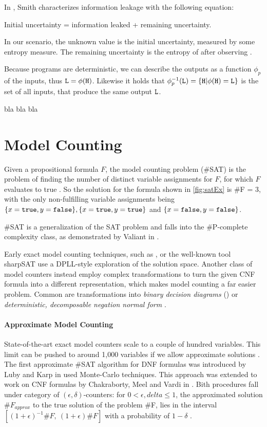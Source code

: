 In \cite{smith09}, Smith characterizes information leakage with the following equation:
\begin{center}
    Initial uncertainty = information leaked + remaining uncertainty.
\end{center}
In our scenario, the unknown value \In is the initial uncertainty, measured by some entropy measure. The remaining uncertainty is the entropy of \In after observing \Out. 

Because programs are deterministic, we can describe the outputs as a function $\phi_p$ of the inputs, thus $\mathtt{L} = \phi(\mathtt{H})$. Likewise it holds that $\phi_p^{-1}(\mathtt{L}) = \{ \mathtt{H} | \phi(\mathtt{H}) = \mathtt{L} \}$ is the set of all inputs, that produce the same output $\mathtt{L}$.

\begin{definition}
        bla bla bla
\end{definition}

\section{Model Counting}

Given a propositional formula $F$, the model counting problem (\#SAT) is the problem of finding the number of distinct variable assignments for $F$, for which $F$ evaluates to true \cite{biere09}. So the solution for the formula shown in  \ref{fig:satEx} is \#F = 3, with the only non-fulfilling variable assignments being $\{ x = \mathtt{true}, y = \mathtt{false}\}, \{x = \mathtt{true}, y = \mathtt{true}\}$ and  $\{x = \mathtt{false}, y = \mathtt{false}\}$.

\#SAT is a generalization of the SAT problem and falls into the \#P-complete complexity class, as demonstrated by Valiant in \cite{valiant79}.

Early exact model counting techniques, such as \cite{birnbaum99}, or the well-known tool sharpSAT \cite{thurley06} use a DPLL-style exploration of the solution space. Another class of model counters instead employ complex transformations to turn the given CNF formula into a different representation, which makes model counting a far easier problem. Common are transformations into \emph{binary decision diagrams} () or \emph{deterministic, decomposable negation normal form} \cite{darwiche04}.

\paragraph*{Approximate Model Counting}
State-of-the-art exact model counters scale to a couple of hundred variables.  This limit can be pushed to around 1,000 variables if we allow approximate solutions \cite{biere09}.
The first approximate \#SAT algorithm for DNF formulas was introduced by Luby and Karp in \cite{karp89} used Monte-Carlo techniques. This approach was extended to work on CNF formulas by Chakraborty, Meel and Vardi in \cite{chakraborty13}. Bith procedures fall under category of $(\epsilon, \delta)$-counters: for $0 < \epsilon, delta \leq 1$, the approximated solution $\#F_{approx}$ to the true solution of the problem \#F, lies in the interval $[(1 + \epsilon)^{-1} \#F, \: (1 + \epsilon) \#F]$ with a probability of $1 - \delta$ \cite{karp89,chakraborty13}.

